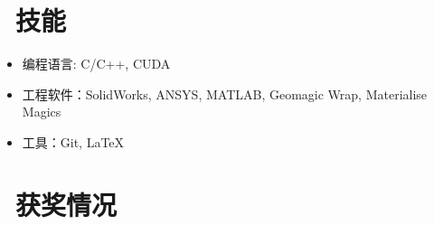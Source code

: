 \documentclass{resume}
\begin{document}

\section{\faCogs\ 技能}
\begin{itemize}[parsep=0.5ex]
  \item 编程语言: C/C++, CUDA
  \item 工程软件：SolidWorks, ANSYS, MATLAB, Geomagic Wrap, Materialise Magics
  \item 工具：Git, \LaTeX
\end{itemize}

\section{\faHeartO\ 获奖情况}


%
%
\end{document}
